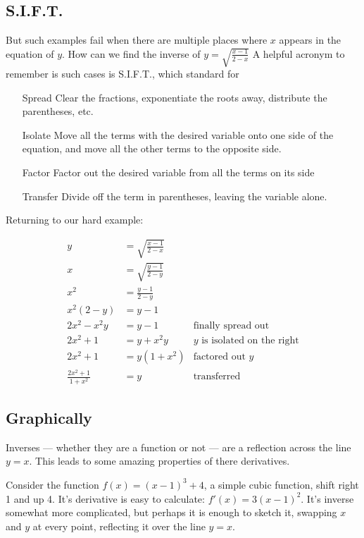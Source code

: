 \subsection{S.I.F.T.}
But such examples fail when there are multiple places where $x$ appears in the equation
of $y$.  How can we find the inverse of $y=\sqrt{\frac{x-1}{2-x}}$  A helpful acronym to 
remember is such cases is S.I.F.T., which standard for
\begin{itemize}
\item[Spread] Clear the fractions, exponentiate the roots away, distribute the parentheses, etc.
\item[Isolate] Move all the terms with the desired variable onto one side of the equation, and move all the other terms to the opposite side.
\item[Factor] Factor out the desired variable from all the terms on its side
\item[Transfer] Divide off the term in parentheses, leaving the variable alone.
\end{itemize}
Returning to our hard example:

\begin{align*}
	y  &= \sqrt{\frac{x-1}{2-x}}\\
	x  &= \sqrt{\frac{y-1}{2-y}}\\
	x^2 &= \frac{y-1}{2-y}\\
	x^2(2-y) &= y-1 \\
	2x^2-x^2y &= y-1 &\text{finally spread out}\\
	2x^2 + 1 &= y + x^2y & \text{$y$ is isolated on the right}\\
	2x^2 + 1 &= y(1+x^2) & \text{factored out $y$}\\
	\frac{2x^2+1}{1+x^2} &= y & \text{transferred}
\end{align*}


\subsection{Graphically}
Inverses --- whether they are a function or not --- are a reflection across the line $y=x$.
This leads to some amazing properties of there derivatives.

Consider the function $f(x) = (x-1)^3+4$, a simple cubic function, shift right 1 and up 4.
It's derivative is easy to calculate: $f'(x)=3(x-1)^2$.  It's inverse somewhat more complicated,
but perhaps it is enough to sketch it, swapping $x$ and $y$ at every point, reflecting it over
the line $y=x$.

